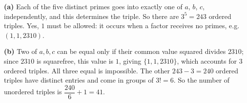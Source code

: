 \textbf{(a)} Each of the five distinct primes goes into exactly one of $a$, $b$, $c$, independently, and this determines the triple. So there are $3^5=\boxed{243}$ ordered triples. Yes, $1$ must be allowed: it occurs when a factor receives no primes, e.g. $(1,1,2310)$.

\textbf{(b)} Two of $a,b,c$ can be equal only if their common value squared divides $2310$; since $2310$ is squarefree, this value is $1$, giving $\{1,1,2310\}$, which accounts for $3$ ordered triples. All three equal is impossible. The other $243-3=240$ ordered triples have distinct entries and come in groups of $3!=6$. So the number of unordered triples is $\dfrac{240}{6}+1=\boxed{41}$.

